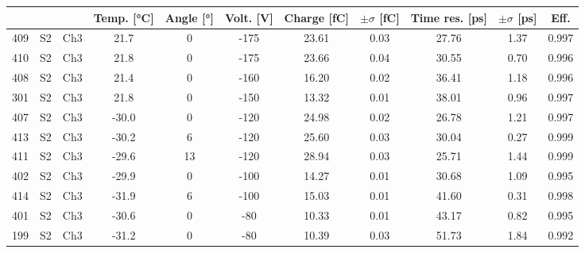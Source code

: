 \begin{tabular}{ccccccccccc}
\toprule
 &  &  & Temp. [°C] & Angle [°] & Volt. [V] & Charge [fC] & \(\pm\sigma\) [fC] & Time res. [ps] & \(\pm\sigma\) [ps] & Eff. \\
\midrule
409 & S2 & Ch3 & 21.7 & 0 & -175 & 23.61 & 0.03 & 27.76 & 1.37 & 0.997 \\
410 & S2 & Ch3 & 21.8 & 0 & -175 & 23.66 & 0.04 & 30.55 & 0.70 & 0.996 \\
408 & S2 & Ch3 & 21.4 & 0 & -160 & 16.20 & 0.02 & 36.41 & 1.18 & 0.996 \\
301 & S2 & Ch3 & 21.8 & 0 & -150 & 13.32 & 0.01 & 38.01 & 0.96 & 0.997 \\
407 & S2 & Ch3 & -30.0 & 0 & -120 & 24.98 & 0.02 & 26.78 & 1.21 & 0.997 \\
413 & S2 & Ch3 & -30.2 & 6 & -120 & 25.60 & 0.03 & 30.04 & 0.27 & 0.999 \\
411 & S2 & Ch3 & -29.6 & 13 & -120 & 28.94 & 0.03 & 25.71 & 1.44 & 0.999 \\
402 & S2 & Ch3 & -29.9 & 0 & -100 & 14.27 & 0.01 & 30.68 & 1.09 & 0.995 \\
414 & S2 & Ch3 & -31.9 & 6 & -100 & 15.03 & 0.01 & 41.60 & 0.31 & 0.998 \\
401 & S2 & Ch3 & -30.6 & 0 & -80 & 10.33 & 0.01 & 43.17 & 0.82 & 0.995 \\
199 & S2 & Ch3 & -31.2 & 0 & -80 & 10.39 & 0.03 & 51.73 & 1.84 & 0.992 \\
\bottomrule
\end{tabular}
